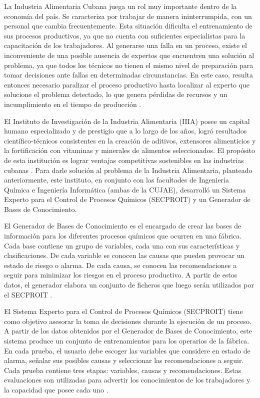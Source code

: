 La Industria Alimentaria Cubana juega un rol muy importante dentro de la economía del país. Se caracteriza por trabajar de manera ininterrumpida, con un personal que cambia frecuentemente. Esta situación dificulta el entrenamiento de sus procesos productivos, ya que no cuenta con suficientes especialistas para la capacitación de los trabajadores. Al generarse una falla en un proceso, existe el inconveniente de una posible ausencia de expertos que encuentren una solución al problema, ya que todos los técnicos no tienen el mismo nivel de preparación para tomar decisiones ante fallas en determinadas circunstancias. En este caso, resulta entonces necesario paralizar el proceso productivo hasta localizar al experto que solucione el problema detectado, lo que genera pérdidas de recursos y un incumplimiento en el tiempo de producción \cite{gestorBases}.

El Instituto de Investigación de la Industria Alimentaria (IIIA) posee un capital humano especializado y de prestigio que a lo largo de los años, logró resultados científico-técnicos consistentes en la creación de aditivos, extensores alimenticios y la fortificación con vitaminas y minerales de alimentos seleccionados. El propósito de esta institución es lograr ventajas competitivas sostenibles en las industrias cubanas \cite{anaMailen}. 
Para darle solución al problema de la Industria Alimentaria, planteado anteriormente, este instituto, en conjunto con las facultades de Ingeniería Química e Ingeniería Informática (ambas de la CUJAE), desarrolló un Sistema Experto para el Control de Procesos Químicos (SECPROIT) y un Generador de Bases de Conocimiento.

El Generador de Bases de Conocimiento es el encargado de crear las bases de información para los diferentes procesos químicos que ocurren en una fábrica. Cada base contiene un grupo de variables, cada una con sus características y clasificaciones. De cada variable se conocen las causas que pueden provocar un estado de riesgo o alarma. De cada causa, se conocen las recomendaciones a seguir para minimizar los riesgos en el proceso productivo. A partir de estos datos, el generador elabora un conjunto de ficheros que luego serán utilizados por el SECPROIT \cite{anaMailen}.

El Sistema Experto para el Control de Procesos Químicos (SECPROIT) tiene como objetivo asesorar la toma de decisiones durante la ejecución de un proceso. A partir de los datos obtenidos por el Generador de Bases de Conocimiento, este sistema produce un conjunto de entrenamientos para los operarios de la fábrica. En cada prueba, el usuario debe escoger las variables que considere en estado de alarma, señalar sus posibles causas y seleccionar las recomendaciones a seguir. Cada prueba contiene tres etapas: variables, causas y recomendaciones. Estas evaluaciones son utilizadas para advertir los conocimientos de los trabajadores y la capacidad que posee cada uno \cite{elena}.

